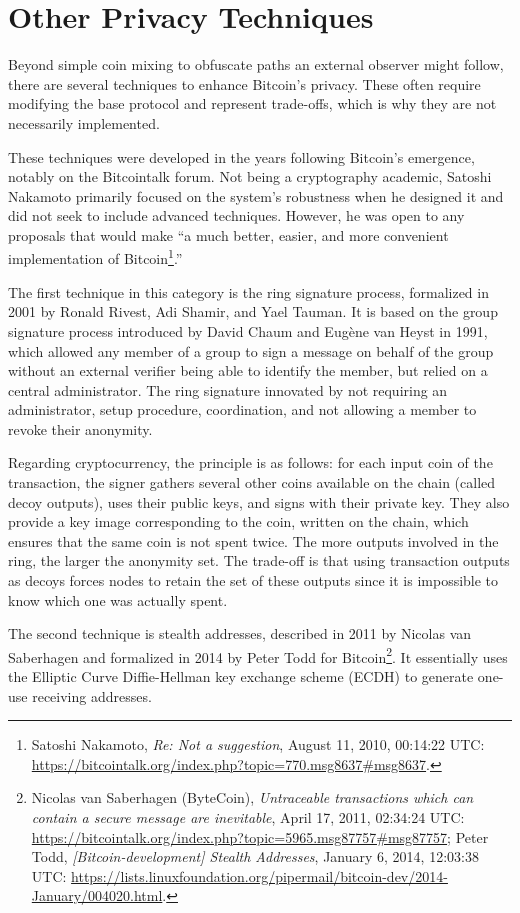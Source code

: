 \documentclass[
  a5paper,
  smalldemyvopaper,10pt,twoside,onecolumn,openright,extrafontsizes,hidelinks]{memoir}
\begin{document}
\section*{Other Privacy Techniques}\label{other-privacy-techniques}


Beyond simple coin mixing to obfuscate paths an external observer might
follow, there are several techniques to enhance Bitcoin's privacy. These
often require modifying the base protocol and represent trade-offs,
which is why they are not necessarily implemented.

These techniques were developed in the years following Bitcoin's
emergence, notably on the Bitcointalk forum. Not being a cryptography
academic, Satoshi Nakamoto primarily focused on the system's robustness
when he designed it and did not seek to include advanced techniques.
However, he was open to any proposals that would make ``a much better,
easier, and more convenient implementation of Bitcoin\footnote{Satoshi
  Nakamoto, \emph{Re: Not a suggestion}, August 11, 2010, 00:14:22 UTC:
  \url{https://bitcointalk.org/index.php?topic=770.msg8637\#msg8637}.}.''

The first technique in this category is the ring signature process,
formalized in 2001 by Ronald Rivest, Adi Shamir, and Yael Tauman. It is
based on the group signature process introduced by David Chaum and
Eugène van Heyst in 1991, which allowed any member of a group to sign a
message on behalf of the group without an external verifier being able
to identify the member, but relied on a central administrator. The ring
signature innovated by not requiring an administrator, setup procedure,
coordination, and not allowing a member to revoke their anonymity.

Regarding cryptocurrency, the principle is as follows: for each input
coin of the transaction, the signer gathers several other coins
available on the chain (called decoy outputs), uses their public keys,
and signs with their private key. They also provide a key image
corresponding to the coin, written on the chain, which ensures that the
same coin is not spent twice. The more outputs involved in the ring, the
larger the anonymity set. The trade-off is that using transaction
outputs as decoys forces nodes to retain the set of these outputs since
it is impossible to know which one was actually spent.

The second technique is stealth addresses, described in 2011 by Nicolas
van Saberhagen and formalized in 2014 by Peter Todd for
Bitcoin\footnote{Nicolas van Saberhagen (ByteCoin), \emph{Untraceable
  transactions which can contain a secure message are inevitable}, April
  17, 2011, 02:34:24 UTC:
  \url{https://bitcointalk.org/index.php?topic=5965.msg87757\#msg87757};
  Peter Todd, \emph{{[}Bitcoin-development{]} Stealth Addresses},
  January 6, 2014, 12:03:38 UTC:
  \url{https://lists.linuxfoundation.org/pipermail/bitcoin-dev/2014-January/004020.html}.}.
It essentially uses the Elliptic Curve Diffie-Hellman key exchange
scheme (ECDH) to generate one-use receiving addresses.
\end{document}
